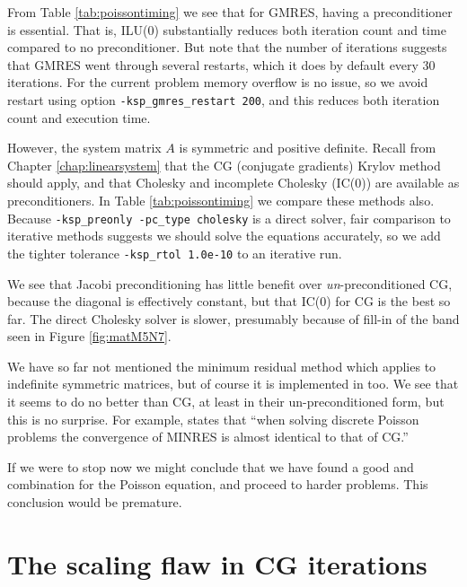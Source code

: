 From Table \ref{tab:poissontiming} we see that for GMRES, having a preconditioner is essential.  That is, ILU($0$) substantially reduces both iteration count and time compared to no preconditioner.  But note that the number of iterations suggests that GMRES went through several restarts, which it does by default every 30 iterations.  For the current problem memory overflow is no issue, so we avoid restart using option \texttt{-ksp\_gmres\_restart 200}, and this reduces both iteration count and execution time.

However, the system matrix $A$ is symmetric and positive definite.  Recall from Chapter \ref{chap:linearsystem} that the CG (conjugate gradients) Krylov method should apply, and that Cholesky and incomplete Cholesky (IC($0$)) are available as preconditioners.  In Table \ref{tab:poissontiming} we compare these methods also.  Because \texttt{-ksp\_preonly -pc\_type cholesky} is a direct solver, fair comparison to iterative methods suggests we should solve the equations accurately, so we add the tighter tolerance \texttt{-ksp\_rtol 1.0e-10} to an iterative run.

We see that Jacobi preconditioning has little benefit over \emph{un}-preconditioned CG, because the diagonal is effectively constant, but that IC($0$) for CG is the best so far.  The direct Cholesky solver is slower, presumably because of fill-in of the band seen in Figure \ref{fig:matM5N7}.

We have so far not mentioned the minimum residual method \citep[MINRES]{Greenbaum1997} which applies to indefinite symmetric matrices, but of course it is implemented in \PETSc too.  We see that it seems to do no better than CG, at least in their un-preconditioned form, but this is no surprise.  For example, \citet[][p.~88]{Elmanetal2005} states that ``when solving discrete Poisson problems the convergence of MINRES is almost identical to that of CG.''

If we were to stop now we might conclude that we have found a good \pKSP and \pPC combination for the Poisson equation, and proceed to harder problems.  This conclusion would be premature.


\section{The scaling flaw in CG iterations}


